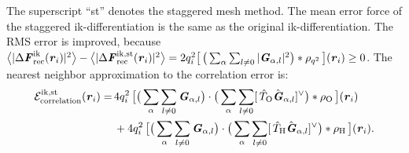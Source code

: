 \documentclass[aps,pre,preprint,unsortedaddress]{revtex4}
\renewcommand{\v}[1]{\textbf{\textit{#1}}}
\begin{document}
The superscript ``st'' denotes the staggered mesh method.
The mean error force of the staggered ik-differentiation is the
same as the original ik-differentiation.
The RMS error is improved, because
$\big\langle\vert\Delta\v F_{\textrm{rec}}^{\textrm{ik}}(\v r_i)\vert^2\big\rangle -
\big\langle\vert\Delta\v F_{\textrm{rec}}^{\textrm{ik,st}}(\v r_i)\vert^2\big\rangle=
2q_i^2
\big[\,
\big(
\sum_{\alpha} \sum_{l\neq 0}
\vert \v G_{\alpha,l}\vert^2
\big)
\ast \rho_{q^2}
\,\big] (\v r_i) \geq 0$.
The nearest neighbor approximation to the correlation error is:
\begin{align}\nonumber
  \mathcal E^{\textrm{ik,st}}_{\textrm{correlation}}(\v r_i)
  =\,&
  4q_i^2\,
  \big[
  \big(
  \sum_{\alpha} \sum_{l\neq 0}  
  \v G_{\alpha,l}
  \big)
  \cdot
  \big(
  \sum_{\alpha} \sum_{l\neq 0}  
  [\,\hat T_{\textrm{O}}\hat{\v G}_{\alpha,l}]^{\vee}
  \big)
  \ast \rho_{\textrm{O}}\,
  \big] (\v r_i) \\\nonumber
  \,&+
  4q_i^2\,
  \big[
  \big(
  \sum_{\alpha} \sum_{l\neq 0}  
  \v G_{\alpha,l}
  \big)
  \cdot
  \big(
  \sum_{\alpha} \sum_{l\neq 0}  
  [\,\hat T_{\textrm{H}}\hat{\v G}_{\alpha,l}]^{\vee}
  \big)
  \ast \rho_{\textrm{H}}\,
  \big] (\v r_i).
\end{align}
\end{document}
